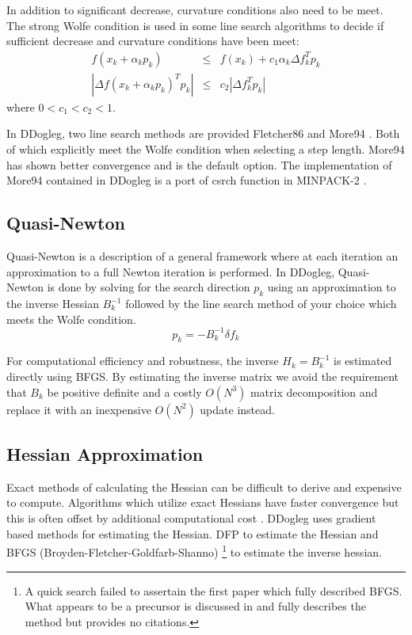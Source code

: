 \documentclass[peerreview,compsoc,onecolumn]{IEEEtran}
\begin{document}
In addition to significant decrease, curvature conditions also need to be meet. The strong Wolfe condition is used in some line search algorithms to decide if sufficient decrease and curvature conditions have been meet:
\begin{eqnarray}
f(x_k + \alpha_k p_k) &\le& f(x_k) + c_1 \alpha_k \Delta f^T_k p_k \\
|\Delta f(x_k + \alpha_k p_k)^T p_k| &\le& c_2 |\Delta f_k^T p_k|
\end{eqnarray}
where $0 < c_1 < c_2 < 1$.

In DDogleg, two line search methods are provided Fletcher86 \cite{Fletcher1986} and More94 \cite{More1994}. Both of which explicitly meet the Wolfe condition when selecting a step length. More94 has shown better convergence and is the default option. The implementation of More94 contained in DDogleg is a port of csrch function in MINPACK-2 \cite{MINPACK}.

\subsection{Quasi-Newton}

Quasi-Newton is a description of a general framework where at each iteration an approximation to a full Newton iteration is performed. In DDogleg, Quasi-Newton is done by solving for the search direction $p_k$ using an approximation to the inverse Hessian $B_k^{-1}$ followed by the line search method of your choice which meets the Wolfe condition.
\begin{equation}
p_k = -B_k^{-1}\delta f_k
\end{equation}

For computational efficiency and robustness, the inverse $H_k = B_k^{-1}$ is estimated directly using BFGS. By estimating the inverse matrix we avoid the requirement that $B_k$ be positive definite and a costly $O(N^3)$ matrix decomposition and replace it with an inexpensive $O(N^2)$ update instead.
 
\subsection{Hessian Approximation}
\label{sec:hessian_approx}

Exact methods of calculating the Hessian can be difficult to derive and expensive to compute. Algorithms which utilize exact Hessians have faster convergence but this is often offset by additional computational cost \cite{numopt2006}. DDogleg uses gradient based methods for estimating the Hessian. DFP \cite{davidonDFP} to estimate the Hessian and BFGS (Broyden-Fletcher-Goldfarb-Shanno) \cite{fletcher1987,numopt2006}\footnote{A quick search failed to assertain the first paper which fully described BFGS. What appears to be a precursor is discussed in \cite{fletcher1987} and \cite{numopt2006} fully describes the method but provides no citations.} to estimate the inverse hessian.
\end{document}
